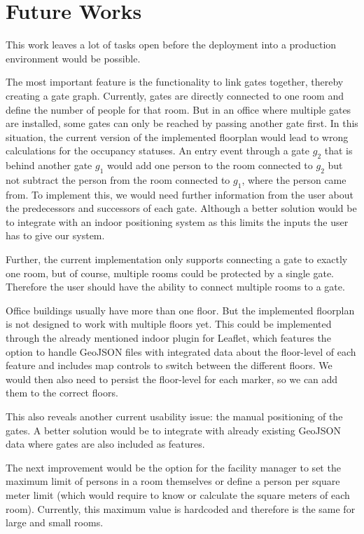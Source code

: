 \section{Future Works}

This work leaves a lot of tasks open before the deployment into a production environment would be possible.

The most important feature is the functionality to link gates together, thereby creating a gate graph. Currently, gates are directly connected to one room and define the number of people for that room. But in an office where multiple gates are installed, some gates can only be reached by passing another gate first. In this situation, the current version of the implemented floorplan would lead to wrong calculations for the occupancy statuses. An entry event through a gate \(g_2\) that is behind another gate \(g_1\) would add one person to the room connected to \(g_2\) but not subtract the person from the room connected to \(g_1\), where the person came from. To implement this, we would need further information from the user about the predecessors and successors of each gate. Although a better solution would be to integrate with an indoor positioning system as this limits the inputs the user has to give our system.

Further, the current implementation only supports connecting a gate to exactly one room, but of course, multiple rooms could be protected by a single gate. Therefore the user should have the ability to connect multiple rooms to a gate.

Office buildings usually have more than one floor. But the implemented floorplan is not designed to work with multiple floors yet. This could be implemented through the already mentioned indoor plugin for Leaflet, which features the option to handle GeoJSON files with integrated data about the floor-level of each feature and includes map controls to switch between the different floors. We would then also need to persist the floor-level for each marker, so we can add them to the correct floors.

This also reveals another current usability issue: the manual positioning of the gates. A better solution would be to integrate with already existing GeoJSON data where gates are also included as features.

The next improvement would be the option for the facility manager to set the maximum limit of persons in a room themselves or define a person per square meter limit (which would require to know or calculate the square meters of each room). Currently, this maximum value is hardcoded and therefore is the same for large and small rooms.


